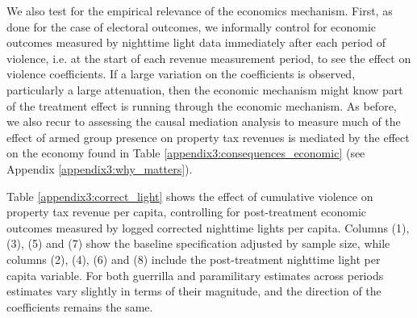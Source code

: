 
We also test for the empirical relevance of the economics mechanism. First, as done for the case of electoral outcomes, we informally control for economic outcomes measured by nighttime light data immediately after each period of violence, i.e. at the start of each revenue measurement period, to see the effect on violence coefficients. If a large variation on the coefficients is observed, particularly a large attenuation, then the economic mechanism might know part of the treatment effect is running through the economic mechanism. As before, we also recur to assessing the causal mediation analysis to measure much of the effect of armed group presence on property tax revenues is mediated by the effect on the economy found in Table \ref{appendix3:consequences_economic} (see Appendix \ref{appendix3:why_matters}). 

Table \ref{appendix3:correct_light} shows the effect of cumulative violence on property tax revenue per capita, controlling for post-treatment economic outcomes measured by logged corrected nighttime lights per capita. Columns (1), (3), (5) and (7) show the baseline specification adjusted by sample size, while columns (2), (4), (6) and (8) include the post-treatment nighttime light per capita variable. For both guerrilla and paramilitary estimates across periods estimates vary slightly in terms of their magnitude, and the direction of the coefficients remains the same.  



